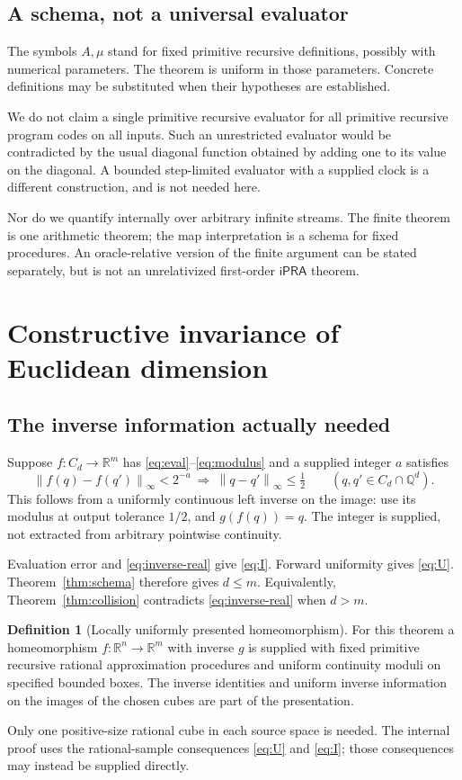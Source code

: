 \documentclass[11pt,a4paper]{article}
\theoremstyle{definition}
\newtheorem{definition}[theorem]{Definition}
\newcommand{\Q}{\mathbb Q}\newcommand{\R}{\mathbb R}
\newcommand{\ipra}{\mathsf{iPRA}}
\newcommand{\norm}[1]{\left\lVert #1\right\rVert_{\infty}}
\begin{document}
\subsection{A schema, not a universal evaluator}
The symbols $A,\mu$ stand for fixed primitive recursive
definitions, possibly with numerical parameters. The
theorem is uniform in those parameters. Concrete definitions
may be substituted when their hypotheses are established.

We do not claim a single primitive recursive evaluator for
all primitive recursive program codes on all inputs. Such
an unrestricted evaluator would be contradicted by the
usual diagonal function obtained by adding one to its value
on the diagonal. A bounded step-limited evaluator with a
supplied clock is a different construction, and is not
needed here.

Nor do we quantify internally over arbitrary infinite
streams. The finite theorem is one arithmetic theorem;
the map interpretation is a schema for fixed procedures.
An oracle-relative version of the finite argument can be
stated separately, but is not an unrelativized first-order
$\ipra$ theorem.

\section{Constructive invariance of Euclidean dimension}
\subsection{The inverse information actually needed}
Suppose $f:C_d\to\R^m$ has \eqref{eq:eval}--\eqref{eq:modulus}
and a supplied integer $a$ satisfies
\begin{equation}\label{eq:inverse-real}
 \norm{f(q)-f(q')}<2^{-a}
       \ \Longrightarrow\
 \norm{q-q'}\leq\tfrac12
 \qquad(q,q'\in C_d\cap\Q^d).
\end{equation}
This follows from a uniformly continuous left inverse on
the image: use its modulus at output tolerance $1/2$,
and $g(f(q))=q$. The integer is supplied, not extracted
from arbitrary pointwise continuity.

Evaluation error and \eqref{eq:inverse-real} give \eqref{eq:I}.
Forward uniformity gives \eqref{eq:U}. Theorem~\ref{thm:schema}
therefore gives $d\leq m$. Equivalently,
Theorem~\ref{thm:collision} contradicts \eqref{eq:inverse-real}
when $d>m$.

\begin{definition}[Locally uniformly presented homeomorphism]
For this theorem a homeomorphism $f:\R^n\to\R^m$ with inverse
$g$ is supplied with fixed primitive recursive rational
approximation procedures and uniform continuity moduli on
specified bounded boxes. The inverse identities and uniform
inverse information on the images of the chosen cubes are
part of the presentation.

Only one positive-size rational cube in each source space
is needed. The internal proof uses the rational-sample
consequences \eqref{eq:U} and \eqref{eq:I}; those consequences
may instead be supplied directly.
\end{definition}
\end{document}
